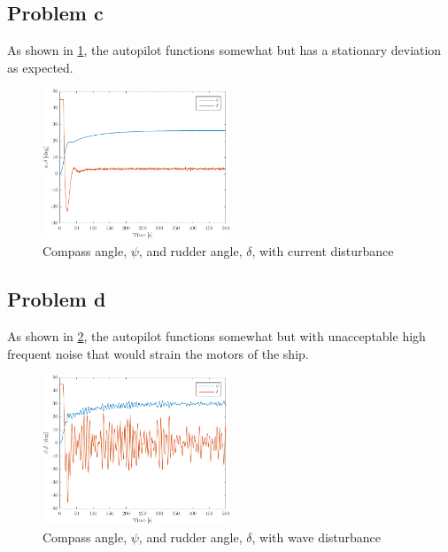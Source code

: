 \subsection{Problem c}
As shown in \cref{fig:3b-psi_and_rudder_w_current}, the autopilot functions somewhat but has a stationary deviation as expected.

\begin{figure}[ht]
    \centering
    \includegraphics[width=0.5\textwidth]{images/3c-psi_and_rudder_w_current}
    \caption{Compass angle, $\psi$, and rudder angle, $\delta$, with current disturbance}
    \label{fig:3b-psi_and_rudder_w_current}
\end{figure}

\subsection{Problem d}
As shown in \cref{fig:3b-psi_and_rudder_w_waves}, the autopilot functions somewhat but with unacceptable high frequent noise that would strain the motors of the ship.

\begin{figure}[ht]
    \centering
    \includegraphics[width=0.5\textwidth]{images/3d-psi_and_rudder_w_waves}
    \caption{Compass angle, $\psi$, and rudder angle, $\delta$, with wave disturbance}
    \label{fig:3b-psi_and_rudder_w_waves}
\end{figure}